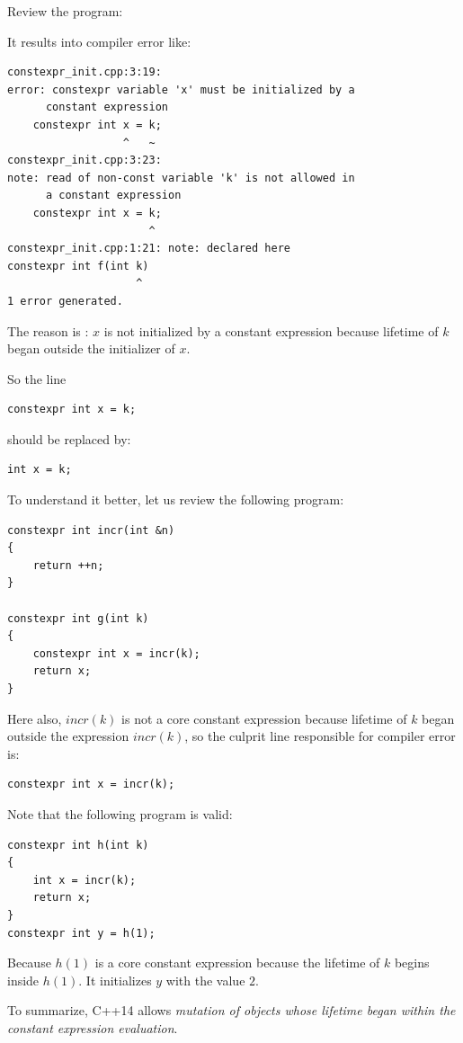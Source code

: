 \begin{Exercise}[title={constexpr and mutation}, difficulty=2, label=ex020]
Review the program:

\end{Exercise}


\begin{Answer}[ref=ex020]
It results into compiler error like:
\begin{verbatim}
constexpr_init.cpp:3:19: 
error: constexpr variable 'x' must be initialized by a
      constant expression
    constexpr int x = k;
                  ^   ~
constexpr_init.cpp:3:23: 
note: read of non-const variable 'k' is not allowed in
      a constant expression
    constexpr int x = k;
                      ^
constexpr_init.cpp:1:21: note: declared here
constexpr int f(int k) 
                    ^
1 error generated.

\end{verbatim}
The reason is : $x$ is not initialized by a constant expression because lifetime of $k$ began outside the initializer of $x$.

So the line 
\begin{lstlisting}[numbers=none]
constexpr int x = k;
\end{lstlisting}
should be replaced by:
\begin{lstlisting}[numbers=none]
int x = k;
\end{lstlisting}

To understand it better, let us review the following program:
\begin{lstlisting}
constexpr int incr(int &n) 
{
    return ++n;
}

constexpr int g(int k) 
{
    constexpr int x = incr(k);
    return x;
}
\end{lstlisting}
Here also, $incr(k)$ is not a core constant expression because lifetime of $k$ began outside the expression $incr(k)$, so the culprit line responsible for compiler error is:
\begin{lstlisting}
constexpr int x = incr(k);
\end{lstlisting}

Note that the following program is valid:
\begin{lstlisting}
constexpr int h(int k) 
{
    int x = incr(k);
    return x;
}
constexpr int y = h(1);
\end{lstlisting}
Because $h(1)$ is a core constant expression because the lifetime of $k$ begins inside $h(1)$. It initializes $y$ with the value $2$.

To summarize, C++14 allows \emph{mutation of objects whose lifetime began within the constant expression evaluation}.
\end{Answer}



